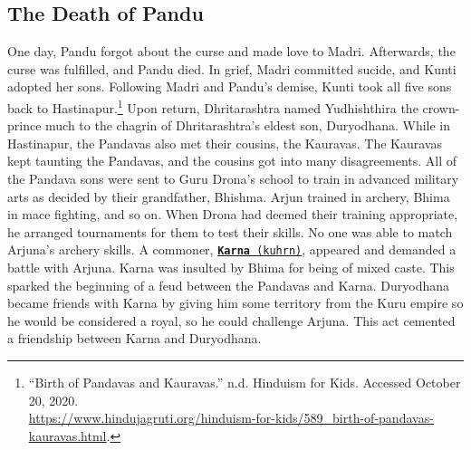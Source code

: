 \documentclass[10pt, letterpaper]{article}
\begin{document}
\subsection{The Death of Pandu}

One day, Pandu forgot about the curse and made love to Madri.
Afterwards, the curse was fulfilled, and Pandu died. In grief, Madri
committed sucide, and Kunti adopted her sons. Following Madri and
Pandu's demise, Kunti took all five sons back to Hastinapur.\footnote{``Birth
  of Pandavas and Kauravas.'' n.d. Hinduism for Kids. Accessed October
  20, 2020. \\

  \href{https://www.hindujagruti.org/hinduism-for-kids/589_birth-of-pandavas-kauravas.html}{\underline{https://www.hindujagruti.org/hinduism-for-kids/589\_birth-of-pandavas-kauravas.html}}.}
Upon return, Dhritarashtra named Yudhishthira the crown-prince much to
the chagrin of Dhritarashtra's eldest son, Duryodhana. While in
Hastinapur, the Pandavas also met their cousins, the Kauravas. The
Kauravas kept taunting the Pandavas, and the cousins got into many
disagreements. All of the Pandava sons were sent to Guru Drona's school
to train in advanced military arts as decided by their grandfather,
Bhishma. Arjun trained in archery, Bhima in mace fighting, and so on.
When Drona had deemed their training appropriate, he arranged
tournaments for them to test their skills. No one was able to match
Arjuna's archery skills. A commoner,
\texttt{\underline{\href{https://drive.google.com/file/d/14PQrVcz19KHFIB80ZpAH2TP48Swfv1Qx/view?usp=sharing}{\textbf{Karna}}
(kuhrn)}}, appeared and demanded a battle with Arjuna. Karna was insulted
by Bhima for being of mixed caste. This sparked the beginning of a feud
between the Pandavas and Karna. Duryodhana became friends with Karna by
giving him some territory from the Kuru empire so he would be considered
a royal, so he could challenge Arjuna. This act cemented a friendship
between Karna and Duryodhana. \\
\end{document}
